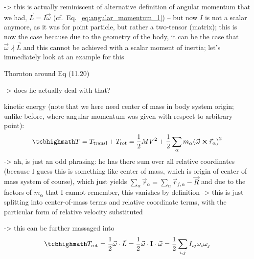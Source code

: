 \documentclass[../class_mech_main.tex]{subfiles}
\begin{document}
-> this is actually reminiscent of alternative definition of angular momentum that we had, $\vec{L} = I \vec{\omega}$ (cf.~Eq.~\eqref{eq:angular_momentum_1}) -- but now $I$ is not a scalar anymore, as it was for point particle, but rather a two-tensor (matrix); this is now the case because due to the geometry of the body, it can be the case that $\vec{\omega} \nparallel \vec{L}$ and this cannot be achieved with a scalar moment of inertia; let's immediately look at an example for this


\begin{ex}
	Thornton around Eq (11.20)

	-> does he actually deal with that?
\end{ex}



kinetic energy (note that we here need center of mass in body system origin; unlike before, where angular momentum was given with respect to arbitrary point):
\begin{equation}
	\eqbox{
		T = T_\mathrm{transl} + T_\mathrm{rot} = \frac{1}{2} M V^2 + \frac{1}{2} \sum_\alpha m_\alpha \qty(\vec{\omega} \cross \vec{r}_\alpha)^2
	}
\end{equation}
 -> ah, is just an odd phrasing: he has there sum over all relative coordinates (because I guess this is something like center of mass, which is origin of center of mass system of course), which just yields $\sum_\alpha \vec{r}_\alpha = \sum_ \alpha \vec{r}_{f, \alpha} - \vec{R}$ and due to the factors of $m_\alpha$ that I cannot remember, this vanishes by definition
-> this is just splitting into center-of-mass terms and relative coordinate terms, with the particular form of relative velocity substituted

-> this can be further massaged into
\begin{equation}
	\eqbox{
		T_\mathrm{rot} = \frac{1}{2} \vec{\omega} \cdot \vec{L} = \frac{1}{2} \vec{\omega} \cdot \tensor{I} \cdot \vec{\omega} = \frac{1}{2} \sum_{i, j} I_{ij} \omega_i \omega_j
	}
\end{equation}
\end{document}

